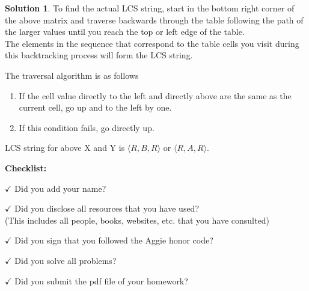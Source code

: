 \documentclass{article}
\theoremstyle{definition}
\newtheorem*{solution}{Solution}
\newcommand{\checklist}{\noindent\textbf{Checklist:}
\begin{compactitem}[$\Box$] 
\item [$\checkmark$] Did you add your name? 
\item [$\checkmark$] Did you disclose all resources that you have used? \\
(This includes all people, books, websites, etc. that you have consulted)
\item [$\checkmark$] Did you sign that you followed the Aggie honor code? 
\item [$\checkmark$] Did you solve all problems? 
\item [$\checkmark$] Did you submit the pdf file of your homework?
\end{compactitem}
}
\begin{document}
\begin{solution}
To find the actual LCS string, start in the bottom right corner of the above matrix and traverse backwards through the table following the path of the larger values until you reach the top or left edge of the table. \\
The elements in the sequence that correspond to the table cells you visit during this backtracking process will form the LCS string.

\noindent
The traversal algorithm is as follows
\begin{enumerate}
    \item If the cell value directly to the left and directly above are the same as the current cell, go up and to the left by one.
    \item If this condition fails, go directly up.
\end{enumerate}
LCS string for above X and Y is $\langle R,B,R \rangle$ or $\langle R,A,R \rangle$.
\end{solution}




\goodbreak
\checklist
\end{document}
